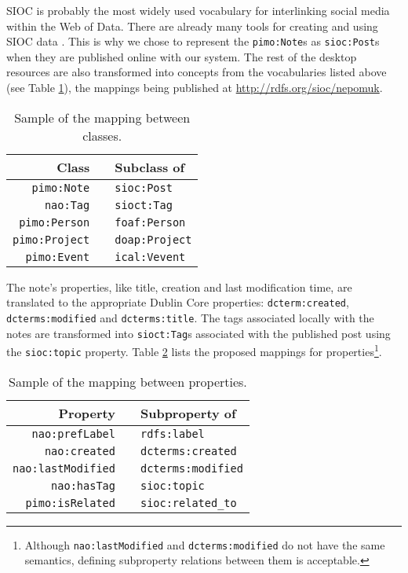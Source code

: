 SIOC is probably the most widely used vocabulary for interlinking social media within the Web of Data.
There are already many tools for creating and using SIOC data \cite{Bojars2008}.
This is why we chose to represent the \verb|pimo:Note|s as \verb|sioc:Post|s when they are published online with our system. The rest of the desktop resources are also transformed into concepts from the vocabularies listed above (see Table \ref{tab:classmappings}), the mappings being published at \url{http://rdfs.org/sioc/nepomuk}.
\begin{table}[htb]
\centering
{}
\begin{tabular}{@{}rcl@{}}
\toprule
Class && Subclass of \\ 
\midrule

\verb|pimo:Note| && \verb|sioc:Post| \\

\verb|nao:Tag| && \verb|sioct:Tag| \\

\verb|pimo:Person| && \verb|foaf:Person| \\

\verb|pimo:Project| && \verb|doap:Project| \\

\verb|pimo:Event| && \verb|ical:Vevent| \\

\bottomrule
\end{tabular}
\caption{Sample of the mapping between classes.}
\label{tab:classmappings}
\end{table}
The note's properties, like title, creation and last modification time, are translated to the appropriate Dublin Core properties: \verb|dcterm:created|, \verb|dcterms:modified| and \verb|dcterms:title|. The tags associated locally with the notes are transformed into \verb|sioct:Tag|s associated with the published post using the \verb|sioc:topic| property. Table \ref{tab:propmappings} lists the proposed mappings for properties\footnote{Although \texttt{nao:lastModified} and \texttt{dcterms:modified} do not have the same semantics, defining subproperty relations between them is acceptable.}.

\begin{table}[htb]
\centering
{}
\begin{tabular}{@{}rcl@{}}
\toprule
Property && Subproperty of \\ 
\midrule

\verb|nao:prefLabel| && \verb|rdfs:label| \\

\verb|nao:created| && \verb|dcterms:created| \\

\verb|nao:lastModified| && \verb|dcterms:modified| \\

\verb|nao:hasTag| && \verb|sioc:topic| \\

\verb|pimo:isRelated| && \verb|sioc:related_to| \\

\bottomrule
\end{tabular}
\caption{Sample of the mapping between properties.}
\label{tab:propmappings}
\end{table}
